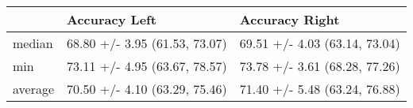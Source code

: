 \begin{tabular}{lll}
\toprule
{} &                  Accuracy Left &                 Accuracy Right \\
\midrule
median  &  68.80 +/- 3.95 (61.53, 73.07) &  69.51 +/- 4.03 (63.14, 73.04) \\
min     &  73.11 +/- 4.95 (63.67, 78.57) &  73.78 +/- 3.61 (68.28, 77.26) \\
average &  70.50 +/- 4.10 (63.29, 75.46) &  71.40 +/- 5.48 (63.24, 76.88) \\
\bottomrule
\end{tabular}
